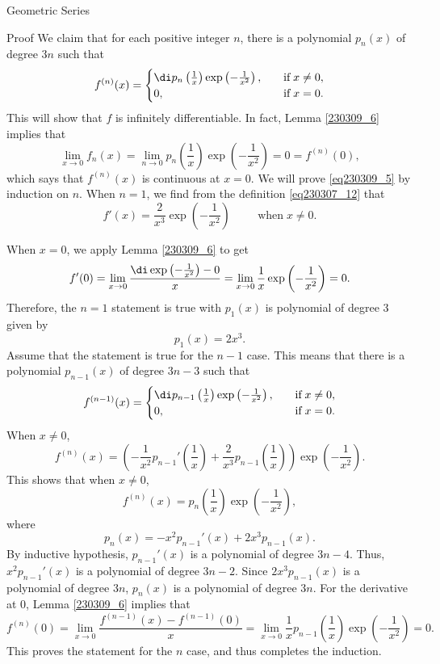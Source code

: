 \begin{example}[label=230305_16]{Geometric Series}
\begin{example}[label=230304_9]{}
\begin{example}{}
\begin{example}{}
\begin{myproof}{Proof} We claim that for each positive integer $n$, there is a polynomial $p_n(x)$ of degree $3n$ such that
 \begin{equation}
\label{eq230309_5}f^{(n)}(x)=\begin{cases}\di p_n\left(\frac{1}{x}\right)\exp\left(-\frac{1}{x^2}\right),\quad &\text{if}\;x\neq 0,\\0,\quad &\text{if}\;x=0.\end{cases}\end{equation}
This will show that $f$ is infinitely differentiable. In fact, Lemma \ref{230309_6} implies that 
\[\lim_{x\to 0}f_n(x)=\lim_{n\to 0}p_n\left(\frac{1}{x}\right)\exp\left(-\frac{1}{x^2}\right)=0=f^{(n)}(0),\]which says that $f^{(n)}(x)$ is continuous at $x=0$.
We will prove  \eqref{eq230309_5}  by induction on $n$.
When $n=1$, we find from the definition \eqref{eq230307_12} that
\[f'(x)=\frac{2}{x^3}\exp\left(-\frac{1}{x^2}\right)\hspace{1cm}\text{when}\;x\neq 0.\] 

When $x=0$, we apply Lemma \ref{230309_6} to get
\[f'(0)=\lim_{x\to 0}\frac{\di \exp\left(-\frac{1}{x^2}\right)-0}{x}=\lim_{x\to 0}\frac{1}{x}\exp\left(-\frac{1}{x^2}\right)=0.\]Therefore, the $n=1$ statement is true with $p_1(x)$ is polynomial of degree 3 given by
\[p_1(x)=2x^3.\]
Assume that the statement is true for the $n-1$ case. This means that there is a polynomial $p_{n-1}(x)$ of degree   $3n -3$ such that
\[f^{(n-1)}(x)=\begin{cases}\di  p_{n-1}\left(\frac{1}{x }\right)\exp\left(-\frac{1}{x^2}\right),\quad &\text{if}\;x\neq 0,\\0,\quad &\text{if}\;x=0.\end{cases}\]When $x\neq 0$,
\[f^{(n)}(x)=\left( -\frac{1}{x^2}p_{n-1}'\left(\frac{1}{x}\right)+\frac{2}{x^3}p_{n-1}\left(\frac{1}{x}\right)\right)\exp\left(-\frac{1}{x^2}\right).\]\bp This shows that when $x\neq 0$,
\[  f^{(n)}(x)=p_{n}\left(\frac{1}{x }\right)\exp\left(-\frac{1}{x^2}\right),\]
where
\[p_n(x)=-x^2 p_{n-1}'(x)+2x^3p_{n-1}(x).\]
By inductive hypothesis, $p_{n-1}'(x)$ is a polynomial of degree $3n-4$. Thus, $x^2 p_{n-1}'(x)$ is a polynomial of degree $3n-2$. Since $2x^3p_{n-1}(x)$ is a polynomial of degree $3n$, $p_n(x)$ is a polynomial of degree $3n$. 
For the derivative at 0, Lemma \ref{230309_6} implies that
\[f^{(n)}(0)=\lim_{x\to 0}\frac{f^{(n-1)}(x)-f^{(n-1)}(0)}{x}=\lim_{x\to 0}\frac{1}{x}p_{n-1}\left(\frac{1}{x}\right)\exp\left(-\frac{1}{x^2}\right)=0.\]
This proves the statement for the $n$ case, and thus completes the induction.\end{myproof}


\end{example}
\end{example}
\end{example}
\end{example}
